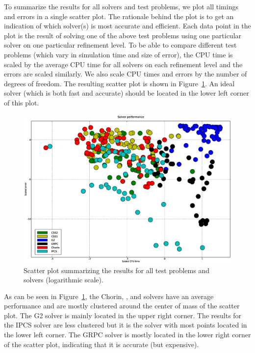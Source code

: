 To summarize the results for all solvers and test problems, we plot
all timings and errors in a single scatter plot. The rationale behind
the plot is to get an indication of which solver(s) is most accurate
and efficient. Each data point in the plot is the result of solving
one of the above test problems using one particular solver on one
particular refinement level. To be able to compare different test
problems (which vary in simulation time and size of error), the CPU
time is scaled by the average CPU time for all solvers on each
refinement level and the errors are scaled similarly. We also scale
CPU times and errors by the number of degrees of freedom. The
resulting scatter plot is shown in Figure~\ref{fig:scatter}. An ideal
solver (which is both fast and accurate) should be located in the
lower left corner of this plot.

\begin{figure}
  \begin{center}
 \includegraphics[width=14cm]{chapters/kvs-1/eps/new_scatter.eps}
  \end{center}
  \caption{Scatter plot summarizing the results for all test problems
    and solvers (logarithmic scale).}
  \label{fig:scatter}
\end{figure}

As can be seen in Figure~\ref{fig:scatter}, the Chorin, , and
 solvers have an average performance and are mostly clustered
around the center of mass of the scatter plot. The G2 solver is mainly
located in the upper right corner. The results for the IPCS solver are
less clustered but it is the solver with most points located in the
lower left corner. The GRPC solver is mostly located in the lower right
corner of the scatter plot, indicating that it is accurate (but
expensive).

